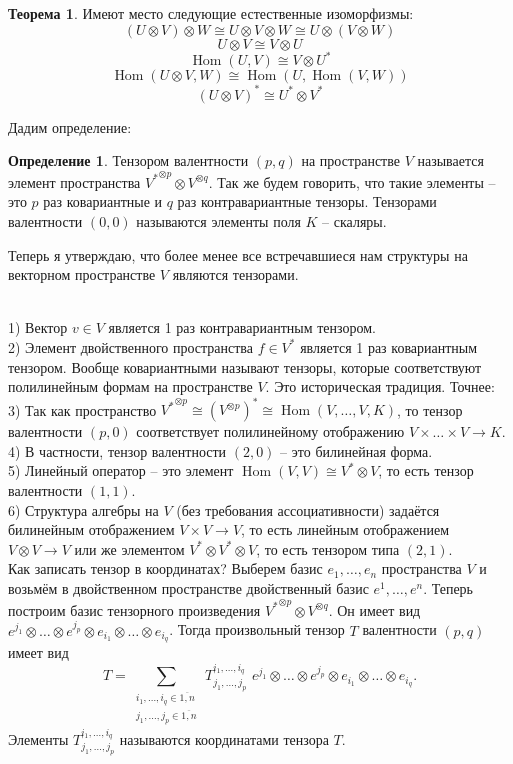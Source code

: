 \documentclass[10pt,a4paper,oneside]{book}
\theoremstyle{definition}
\newtheorem*{defn}{{\color{yellow!20!red} Определение}}
\newtheorem{thm}{{\color{red!40!black} Теорема}}
\newcommand{\ovl}{\overline}
\newcommand{\Hom}{\operatorname{Hom}}
\def\exm{\noindent {\bf Примеры:}}
\def\thrm{\begin{thm}}
\def\ethrm{\end{thm}}
\def\dfn{\begin{defn}}
\def\edfn{\end{defn}}
\begin{document}
\thrm Имеют место следующие естественные изоморфизмы: 
$$(U \otimes V) \otimes W \cong U \otimes V \otimes W \cong U \otimes (V \otimes W)$$
$$ U \otimes V \cong V \otimes U $$
$$ \Hom (U,V) \cong V \otimes U^*$$
$$ \Hom (U\otimes V,  W) \cong \Hom (U, \Hom (V,W))$$
$$(U \otimes V)^{*} \cong U^{*}\otimes V^{*}$$
\ethrm


Дадим определение:

\dfn Тензором валентности $(p,q)$ на пространстве $V$ называется элемент пространства ${V^{*}}^{\otimes p} \otimes V^{\otimes q}$. Так же будем говорить, что такие элементы -- это $p$ раз ковариантные и $q$ раз контравариантные тензоры. Тензорами валентности $(0,0)$ называются элементы поля $K$ -- скаляры.
\edfn

Теперь я утверждаю, что более менее все встречавшиеся нам структуры на векторном пространстве $V$ являются тензорами.



\exm\\
1) Вектор $v\in V$ является 1 раз контравариантным тензором.\\
2) Элемент двойственного пространства $f \in V^{*}$ является 1 раз ковариантным тензором. Вообще ковариантными называют тензоры, которые соответствуют полилинейным формам на пространстве $V$. Это историческая традиция. Точнее:\\
3) Так как пространство ${V^{*}}^{\otimes p} \cong \left(V^{\otimes p}\right)^*\cong \Hom(V,\dots,V,K)$, то тензор валентности $(p,0)$ соответствует полилинейному отображению $V\times\dots \times V \to K$.\\
4) В частности, тензор валентности $(2,0)$ -- это билинейная форма.\\
5) Линейный оператор -- это элемент $\Hom(V,V)\cong V^{*}\otimes V$, то есть тензор валентности $(1,1)$.\\
6) Структура алгебры на $V$ (без требования ассоциативности) задаётся билинейным отображением $V \times V \to V$, то есть линейным отображением $V\otimes V \to V$ или же элементом $V^{*}\otimes V^* \otimes V$, то есть тензором типа $(2,1)$.\\

Как записать тензор в координатах? Выберем базис $e_1,\dots,e_n$ пространства $V$ и возьмём в двойственном пространстве двойственный базис $e^1,\dots,e^n$. Теперь построим базис тензорного произведения ${V^{*}}^{\otimes p}\otimes V^{\otimes q}$. Он имеет вид $e^{j_1}\otimes\dots\otimes e^{j_p}\otimes e_{i_1}\otimes \dots \otimes e_{i_q}$. Тогда произвольный тензор $T$ валентности $(p,q)$ имеет вид 
$$ T= \sum_{\substack{i_1,\dots,i_q \in \ovl{1,n}\\ j_1,\dots,j_p \in \ovl{1,n}} } \,T_{j_1,\dots,j_p}^{i_1,\dots,i_q}\,\, e^{j_1}\otimes\dots\otimes e^{j_p}\otimes e_{i_1}\otimes \dots \otimes e_{i_q}.$$
Элементы $T_{j_1,\dots,j_p}^{i_1,\dots,i_q}$ называются координатами тензора $T$.
\end{document}
